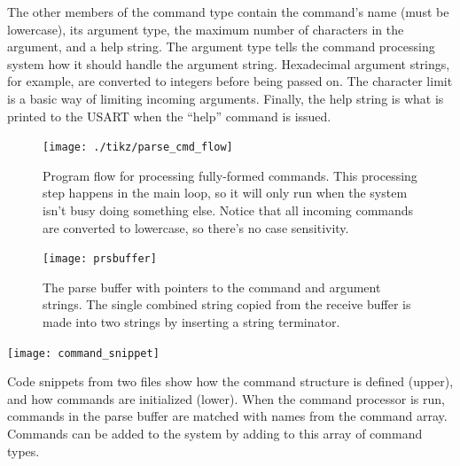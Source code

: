 The other members of the command type contain the command's name (must be lowercase), its argument type, the maximum number of characters in the argument, and a help string.  The argument type tells the command processing system how it should handle the argument string.  Hexadecimal argument strings, for example, are converted to integers before being passed on.  The character limit is a basic way of limiting incoming arguments.  Finally, the help string is what is printed to the USART when the ``help'' command is issued.


\begin{figure}[ht]
    \begin{center}
        \texttt{[image: ./tikz/parse\_cmd\_flow]}
        \caption{Program flow for processing fully-formed commands.  This processing step happens in the main loop, so it will only run when the system isn't busy doing something else.  Notice that all incoming commands are converted to lowercase, so there's no case sensitivity.\label{fig:cmdflow}}
    \end{center}
\end{figure}

\begin{figure}[ht]
    \begin{center}
        \texttt{[image: prsbuffer]}
        \caption{The parse buffer with pointers to the command and argument strings.  The single combined string copied from the receive buffer is made into two strings by inserting a string terminator.\label{fig:prsbuffer}}
    \end{center}
\end{figure}

\begin{listing}[ht]
    \begin{center}
        \texttt{[image: command\_snippet]}
        \caption{Code snippets from two files show how the command structure is defined (upper), and how commands are initialized (lower).  When the command processor is run, commands in the parse buffer are matched with names from the command array.  Commands can be added to the system by adding to this array of command types.\label{lst:cmdsnip}}
    \end{center}
\end{listing}

